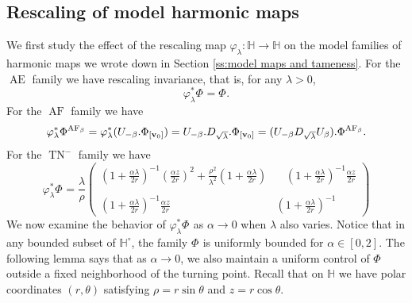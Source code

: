 \documentclass[a4paper,11pt]{amsart}
\theoremstyle{definition}
\numberwithin{equation}{section}
\newcommand{\dH}{\mathbb{H}}
\DeclareMathOperator{\bv}{{\bf v}}
\DeclareMathOperator{\Aea}{AE_\alpha}
\DeclareMathOperator{\Ae}{AE}
\DeclareMathOperator{\TN}{TN}
\DeclareMathOperator{\TNam}{TN^{--}_\alpha}
\DeclareMathOperator{\AF}{AF}
\DeclareMathOperator{\AFa}{AF_\beta}
\begin{document}
\subsection{Rescaling of model harmonic maps}
\label{ss:rescaling of model harmonic maps}
We first study the effect of the rescaling map $\varphi_\lambda:\dH\rightarrow \dH$ on  the model families of harmonic maps we wrote down in Section \ref{ss:model maps and tameness}. For the $\Ae$ family we have rescaling invariance, that is, for any $\lambda>0$,
\begin{equation}
	\varphi_\lambda^*\Phi^{\Aea}=\Phi^{\Aea}.
\end{equation}For the $\AF$ family we have
$$\varphi_\lambda^*\Phi^{\AFa}=\varphi_\lambda^*(U_{-\beta}.\Phi_{[\bv_0]})=U_{-\beta}.D_{{\sqrt{\lambda}}}. \Phi_{[\bv_0]}=(U_{-\beta} D_{{\sqrt{\lambda}}}U_{\beta}). \Phi^{\AFa}.$$
For the $\TN^-$ family we have 
\begin{equation}
	\varphi_\lambda^*\Phi^{\TNam}=\frac{\lambda}{\rho}\left(\begin{matrix}
		(1+\frac{{\alpha}\lambda}{2r})^{-1}(\frac{{\alpha}z}{2r})^2+\frac{\rho^2}{\lambda^2}(1+\frac{{\alpha}\lambda}{2r}) & \ \  \ \ (1+\frac{{\alpha}\lambda}{2r})^{-1}\frac{{\alpha}z}{2r}  \\
		
		\\
		
		(1+\frac{{\alpha}\lambda}{2r})^{-1}\frac{{\alpha}z}{2r}   & (1+\frac{{\alpha}\lambda}{2r})^{-1}
	\end{matrix}\right)
\end{equation}
We now examine the behavior of $\varphi_\lambda^*\Phi^{\TNam}$ as $\alpha\rightarrow 0$ when $\lambda$ also varies. 
Notice that  in any bounded subset of $\mathbb H^\circ$,  the family $\Phi^{\TNam}$ is uniformly bounded for $\alpha\in [0, 2]$. The following lemma says that as $\alpha\rightarrow 0$, we also maintain a uniform control of $\Phi^{\TNam}$ outside a fixed neighborhood of  the turning point. Recall that on $\mathbb H$ we have polar coordinates $(r, \theta)$ satisfying $\rho=r\sin\theta$ and $z=r\cos\theta$. 
\end{document}
